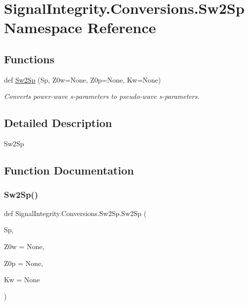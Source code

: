 \hypertarget{namespaceSignalIntegrity_1_1Conversions_1_1Sw2Sp}{}\section{Signal\+Integrity.\+Conversions.\+Sw2\+Sp Namespace Reference}
\label{namespaceSignalIntegrity_1_1Conversions_1_1Sw2Sp}
\subsection*{Functions}
\begin{DoxyCompactItemize}
\item 
def \hyperlink{namespaceSignalIntegrity_1_1Conversions_1_1Sw2Sp_a7e6c57beb38e82818504458e088cec8a}{Sw2\+Sp} (Sp, Z0w=None, Z0p=None, Kw=None)
\begin{DoxyCompactList}\small\item\em Converts power-\/wave s-\/parameters to pseudo-\/wave s-\/parameters. \end{DoxyCompactList}\end{DoxyCompactItemize}


\subsection{Detailed Description}
\begin{DoxyVerb}Sw2Sp\end{DoxyVerb}
 

\subsection{Function Documentation}
\mbox{\label{namespaceSignalIntegrity_1_1Conversions_1_1Sw2Sp_a7e6c57beb38e82818504458e088cec8a}} 
\subsubsection{\texorpdfstring{Sw2\+Sp()}{Sw2Sp()}}
{\footnotesize\ttfamily def Signal\+Integrity.\+Conversions.\+Sw2\+Sp.\+Sw2\+Sp (\begin{DoxyParamCaption}\item[{}]{Sp,  }\item[{}]{Z0w = {\ttfamily None},  }\item[{}]{Z0p = {\ttfamily None},  }\item[{}]{Kw = {\ttfamily None} }\end{DoxyParamCaption})}



